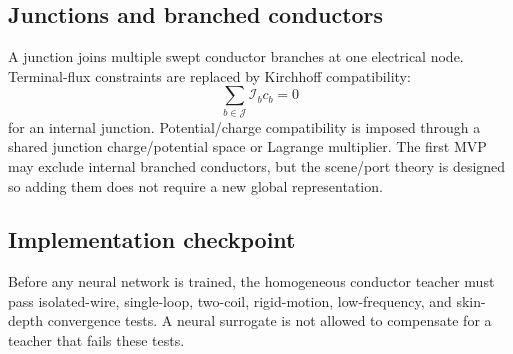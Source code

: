 \subsection{Junctions and branched conductors}

A junction joins multiple swept conductor branches at one electrical node.
Terminal-flux constraints are replaced by Kirchhoff compatibility:
\[
 \sum_{b\in\mathcal J}\mathcal I_b c_b=0
\]
for an internal junction. Potential/charge compatibility is imposed through a
shared junction charge/potential space or Lagrange multiplier. The first MVP
may exclude internal branched conductors, but the scene/port theory is designed
so adding them does not require a new global representation.

\subsection{Implementation checkpoint}

Before any neural network is trained, the homogeneous conductor teacher must
pass isolated-wire, single-loop, two-coil, rigid-motion, low-frequency, and
skin-depth convergence tests. A neural surrogate is not allowed to compensate
for a teacher that fails these tests.
